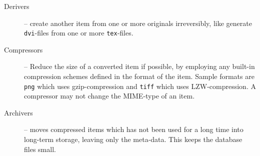 \begin{description}
\item[Derivers] -- create another item from one or more
  originals irreversibly, like generate \texttt{dvi}-files
  from one or more \texttt{tex}-files.


  
\item[Compressors] -- Reduce the size of a converted item if
  possible, by employing any built-in compression schemes
  defined in the format of the item.  Sample formats are
  \texttt{png} which uses gzip-compression and \texttt{tiff}
  which uses LZW-compression.  A compressor may not change
  the MIME-type of an item.
  
  
  
\item[Archivers] -- moves compressed items which has not
  been used for a long time into long-term storage, leaving
  only the meta-data.  This keeps the database files small.

  

\end{description}

